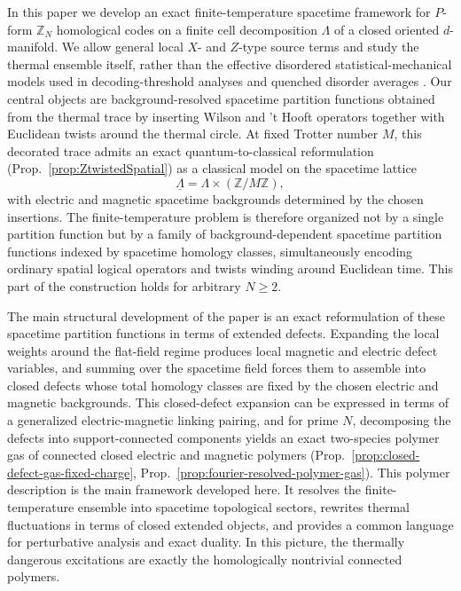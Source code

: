 \documentclass[dvipsnames,a4paper]{article}
\numberwithin{equation}{section}
\theoremstyle{definition}
\theoremstyle{remark}
\begin{document}
In this paper we develop an exact finite-temperature spacetime framework for
\(P\)-form \(\mathbb Z_N\) homological codes on a finite cell decomposition
\(\Lambda\) of a closed oriented \(d\)-manifold. We allow general local \(X\)- and \(Z\)-type source terms and study the thermal
ensemble itself, rather than the effective disordered statistical-mechanical
models used in decoding-threshold analyses and quenched disorder averages
\cite{DennisKitaevLandahlPreskill2002,WangHarringtonPreskill2003,Nishimori1981}. Our central objects are
background-resolved spacetime partition functions obtained from the thermal
trace by inserting Wilson and 't Hooft operators together with Euclidean twists
around the thermal circle. At fixed Trotter number \(M\), this decorated trace
admits an exact quantum-to-classical reformulation
(Prop.~\ref{prop:ZtwistedSpatial}) as a classical model on the spacetime lattice
\begin{equation}
	\underline\Lambda=\Lambda\times (\mathbb Z/M\mathbb Z),
\end{equation}
with electric and magnetic spacetime backgrounds determined by the chosen
insertions. The finite-temperature problem is therefore organized not by a
single partition function but by a family of background-dependent spacetime
partition functions indexed by spacetime homology classes, simultaneously
encoding ordinary spatial logical operators and twists winding around Euclidean
time. This part of the construction holds for arbitrary \(N\ge 2\).

The main structural development of the paper is an exact reformulation of these
spacetime partition functions in terms of extended defects. Expanding the local weights
around the flat-field regime produces local magnetic and electric defect
variables, and summing over the spacetime field forces them to assemble into
closed defects whose total homology classes are fixed by the chosen electric and
magnetic backgrounds. This closed-defect expansion can be
expressed in terms of a generalized electric-magnetic linking pairing, and for prime $N$,
decomposing the defects into support-connected components yields an exact
two-species polymer gas of connected closed electric and magnetic polymers
(Prop.~\ref{prop:closed-defect-gas-fixed-charge},
Prop.~\ref{prop:fourier-resolved-polymer-gas}). This polymer description is the
main framework developed here. It resolves the finite-temperature ensemble into
spacetime topological sectors, rewrites thermal fluctuations in terms of closed
extended objects, and provides a common language for perturbative analysis and
exact duality. In this picture, the thermally dangerous excitations are exactly
the homologically nontrivial connected polymers.
\end{document}
